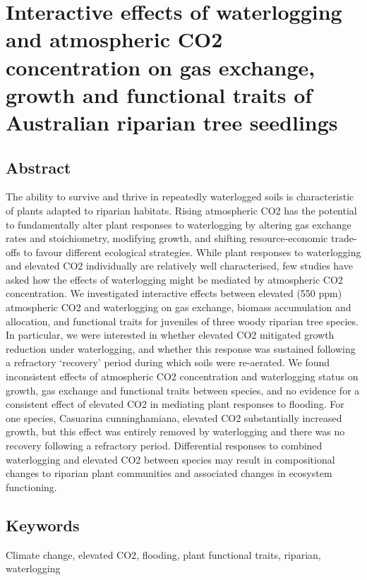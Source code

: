 \documentclass[12pt,a4paper]{memoir}
\begin{document}
\chapter[glasshouse]{Interactive effects of waterlogging and atmospheric CO2 concentration on gas exchange, growth and functional traits of Australian riparian tree seedlings}
\newpage

\OnehalfSpacing
\section*{Abstract}
The ability to survive and thrive in repeatedly waterlogged soils is characteristic of plants adapted to riparian habitats. Rising atmospheric CO2 has the potential to fundamentally alter plant responses to waterlogging by altering gas exchange rates and stoichiometry, modifying growth, and shifting resource-economic trade-offs to favour different ecological strategies. While plant responses to waterlogging and elevated CO2 individually are relatively well characterised, few studies have asked how the effects of waterlogging might be mediated by atmospheric CO2 concentration. We investigated interactive effects between elevated (550 ppm) atmospheric CO2 and waterlogging on gas exchange, biomass accumulation and allocation, and functional traits for juveniles of three woody riparian tree species. In particular, we were interested in whether elevated CO2 mitigated growth reduction under waterlogging, and whether this response was sustained following a refractory ‘recovery’ period during which soils were re-aerated. We found inconsistent effects of atmospheric CO2 concentration and waterlogging status on growth, gas exchange and functional traits between species, and no evidence for a consistent effect of elevated CO2 in mediating plant responses to flooding. For one species, Casuarina cunninghamiana, elevated CO2 substantially increased growth, but this effect was entirely removed by waterlogging and there was no recovery following a refractory period. Differential responses to combined waterlogging and elevated CO2 between species may result in compositional changes to riparian plant communities and associated changes in ecosystem functioning.

\section*{Keywords}
Climate change, elevated CO2, flooding, plant functional traits, riparian, waterlogging
\end{document}
